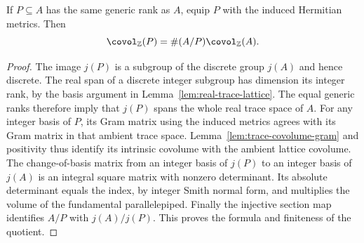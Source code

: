\begin{lemma}
\label{lem:trace-covolume-index}
\leanok
If $P\subseteq A$ has the same generic rank as $A$, equip $P$ with the
induced Hermitian metrics. Then
\[
 \covol_{\mathbb Z}(P)=\#(A/P)\covol_{\mathbb Z}(A).
\]
\end{lemma}
\begin{proof}
The image $j(P)$ is a subgroup of the discrete group $j(A)$ and hence
discrete. The real span of a discrete integer subgroup has dimension its
integer rank, by the basis argument in Lemma~\ref{lem:real-trace-lattice}.
The equal generic ranks therefore imply that $j(P)$ spans the whole real
trace space of $A$. For any integer basis of $P$, its Gram matrix using
the induced metrics agrees with its Gram matrix in that ambient trace
space. Lemma~\ref{lem:trace-covolume-gram} and positivity thus identify
its intrinsic covolume with the ambient lattice covolume.
The change-of-basis matrix from an integer basis of $j(P)$ to an integer
basis of $j(A)$ is an integral square matrix with nonzero determinant.
Its absolute determinant equals the index, by integer Smith normal form,
and multiplies the volume of the fundamental parallelepiped.
Finally the injective section map identifies $A/P$ with $j(A)/j(P)$.
This proves the formula and finiteness of the quotient.
\end{proof}

